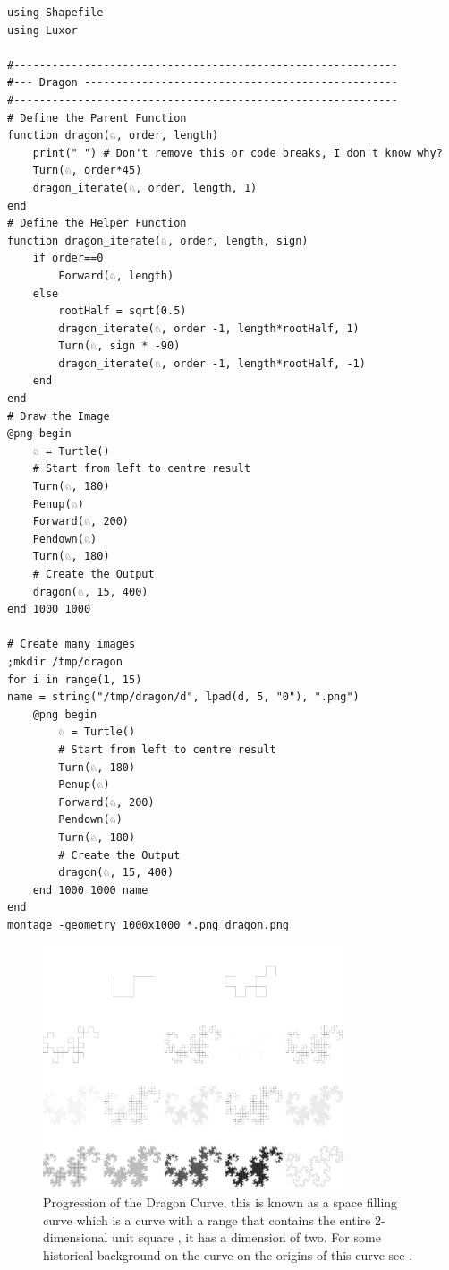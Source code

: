 \documentclass[a4paper,11pt,twoside]{article}
\begin{document}
\begin{listing}[htbp]
\begin{verbatim}
using Shapefile
using Luxor

#------------------------------------------------------------
#--- Dragon -------------------------------------------------
#------------------------------------------------------------
# Define the Parent Function
function dragon(♘, order, length)
    print(" ") # Don't remove this or code breaks, I don't know why?
    Turn(♘, order*45)
    dragon_iterate(♘, order, length, 1)
end
# Define the Helper Function
function dragon_iterate(♘, order, length, sign)
    if order==0
        Forward(♘, length)
    else
        rootHalf = sqrt(0.5)
        dragon_iterate(♘, order -1, length*rootHalf, 1)
        Turn(♘, sign * -90)
        dragon_iterate(♘, order -1, length*rootHalf, -1)
    end
end
# Draw the Image
@png begin
    ♘ = Turtle()
    # Start from left to centre result
    Turn(♘, 180)
    Penup(♘)
    Forward(♘, 200)
    Pendown(♘)
    Turn(♘, 180)
    # Create the Output
    dragon(♘, 15, 400)
end 1000 1000

# Create many images
;mkdir /tmp/dragon
for i in range(1, 15)
name = string("/tmp/dragon/d", lpad(d, 5, "0"), ".png")
    @png begin
        ♘ = Turtle()
        # Start from left to centre result
        Turn(♘, 180)
        Penup(♘)
        Forward(♘, 200)
        Pendown(♘)
        Turn(♘, 180)
        # Create the Output
        dragon(♘, 15, 400)
    end 1000 1000 name
end
montage -geometry 1000x1000 *.png dragon.png

\end{verbatim}
\caption{\label{turtle-dragon}\emph{Julia} code to produce the Dragon Curve shown in Figure \ref{fig:turtle-dragon}}
\end{listing}



\begin{figure}[htbp]
\centering
\includegraphics[width=9cm]{../Problems/Chaos/Spirals/dragon.png}
\caption{\label{fig:turtle-dragon}Progression of the Dragon Curve, this is known as a space filling curve \cite[p. 350]{peitgenChaosFractalsNew2004} which is a curve with a range that contains the entire 2-dimensional unit square \cite{ventrellaSpaceFillingCurvesAre2014}, it has a dimension of two. For some historical background on the curve on the origins of this curve see \cite{tabachnikovDragonCurvesRevisited2014}.}
\end{figure}
\end{document}
